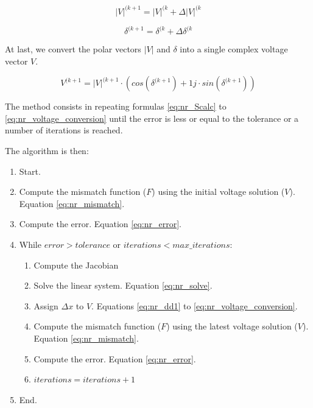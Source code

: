 \documentclass[a4paper,twoside,fleqn]{tufte-book}
\begin{document}

\begin{equation}
|V|^{(k+1} = |V|^{(k} + \Delta |V|^{(k}
\end{equation}

\begin{equation}
\delta^{(k+1} = \delta^{(k} + \Delta \delta^{(k}
\end{equation}

At last, we convert the polar vectors  $|V|$ and $\delta$ into a single complex voltage vector $V$.

\begin{equation}
V^{(k+1} = |V|^{(k+1} \cdot \left( cos(\delta^{(k+1}) + 1j \cdot sin(\delta^{(k+1})\right)
\label{eq:nr_voltage_conversion}
\end{equation}

The method consists in repeating formulas \ref{eq:nr_Scalc} to \ref{eq:nr_voltage_conversion} until the error is less or equal to the tolerance or a number of iterations is reached.

The algorithm is then:

\begin{enumerate}

\item Start.

\item Compute the mismatch function ($F$) using the initial voltage solution ($V$). Equation \ref{eq:nr_mismatch}.

\item Compute the error. Equation \ref{eq:nr_error}.

\item While $error > tolerance$ or $iterations < max\_iterations$:

	\begin{enumerate}
	\item Compute the Jacobian
	
	\item Solve the linear system. Equation \ref{eq:nr_solve}.
	
	\item Assign $\Delta x$ to $V$. Equations \ref{eq:nr_dd1} to \ref{eq:nr_voltage_conversion}.
	
	\item Compute the mismatch function ($F$) using the latest voltage solution ($V$). Equation \ref{eq:nr_mismatch}.
	
	\item Compute the error. Equation \ref{eq:nr_error}.
	
	\item $iterations = iterations + 1$
	\end{enumerate}

\item End.
\end{enumerate}
\end{document}
